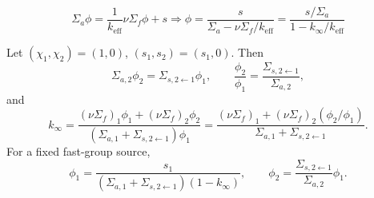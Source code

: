 \begin{handoutcolumns}
\[
  \Sigma_a \phi= \frac{1}{k_{\text{eff}}} \nu\Sigma_f  \phi + s
  \Longrightarrow
  \phi = \frac{s}{\Sigma_a-\nu\Sigma_f/k_{\text{eff}}}
  = \frac{s/\Sigma_a}{1-k_{\infty}/k_{\text{eff}}}
\]

Let $(\chi_1,\chi_2)=(1,0)$, $(s_1,s_2)=(s_1,0)$. Then
\[
 \Sigma_{a,2}\phi_2
 =
 \Sigma_{s,2\gets1}\phi_1,
 \qquad
 \frac{\phi_2}{\phi_1}
 =
 \frac{\Sigma_{s,2\gets1}}{\Sigma_{a,2}},
\]
and
\[
 k_\infty
 =
 \frac{
   (\nu\Sigma_f)_1\phi_1+(\nu\Sigma_f)_2\phi_2
 }{
   \left(\Sigma_{a,1}+\Sigma_{s,2\gets1}\right)\phi_1
 }
 =
 \frac{
   (\nu\Sigma_f)_1
   +(\nu\Sigma_f)_2(\phi_2/\phi_1)
 }{
   \Sigma_{a,1}+\Sigma_{s,2\gets1}
 }.
\]
For a fixed fast-group source,
\[
 \phi_1
 =
 \frac{s_1}
 {\left(\Sigma_{a,1}+\Sigma_{s,2\gets1}\right)(1-k_\infty)},
 \qquad
 \phi_2
 =
 \frac{\Sigma_{s,2\gets1}}{\Sigma_{a,2}}\phi_1 .
\]


\end{handoutcolumns}

